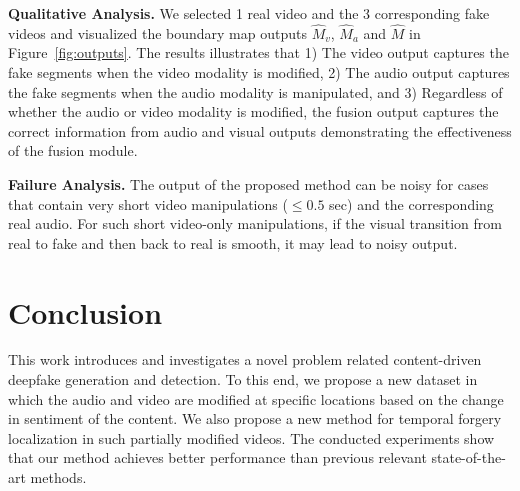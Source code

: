 \documentclass[conference, a4paper]{IEEEtran}
\begin{document}
\begin{table}[t]
\centering
\caption{\textbf{Method comparison in terms of number of parameters.} \textit{\modelabbr{}: the proposed method.}}
\label{tab:complexity}
\end{table}

\noindent \textbf{Qualitative Analysis.} We selected 1 real video and the 3 corresponding fake videos and visualized the boundary map outputs $\hat{M}_v$, $\hat{M}_a$ and $\hat{M}$ in Figure~\ref{fig:outputs}. The results illustrates that 1) The video output captures the fake segments when the video modality is modified, 2) The audio output captures the fake segments when the audio modality is manipulated, and 3) Regardless of whether the audio or video modality is modified, the fusion output captures the correct information from audio and visual outputs demonstrating the effectiveness of the fusion module.

\noindent \textbf{Failure Analysis.} The output of the proposed method can be noisy for cases that contain very short video manipulations ($\leq 0.5$ sec) and the corresponding real audio. For such short video-only manipulations, if the visual transition from real to fake and then back to real is smooth, it may lead to noisy output.

\section{Conclusion} This work introduces and investigates a novel problem related content-driven deepfake generation and detection. To this end, we propose a new dataset in which the audio and video are modified at specific locations based on the change in sentiment of the content. We also propose a new method for temporal forgery localization in such partially modified videos. The conducted experiments show that our method achieves better performance than previous relevant state-of-the-art methods.
\end{document}
